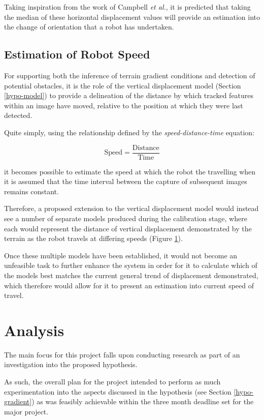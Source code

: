 Taking inspiration from the work of Campbell \textit{et al.}, it is predicted that taking the median of these horizontal displacement values will provide an estimation into the change of orientation that a robot has undertaken.

\subsection{Estimation of Robot Speed}
\label{hypo-speed}
For supporting both the inference of terrain gradient conditions and detection of potential obstacles, it is the role of the vertical displacement model (Section \ref{hypo-model})  to provide a delineation of the distance by which tracked features within an image have moved, relative to the position at which they were last detected. 

Quite simply, using the relationship defined by the \textit{speed-distance-time} equation:

\begin{equation}
\text{Speed} = \frac{\text{Distance}}{\text{Time}} 
\end{equation}

it becomes possible to estimate the speed at which the robot the travelling when it is assumed that the time interval between the capture of subsequent images remains constant.

Therefore, a proposed extension to the vertical displacement model would instead see a number of separate models produced during the calibration stage, where each would represent the distance of vertical displacement demonstrated by the terrain as the robot travels at differing speeds (Figure \ref{}).

Once these multiple models have been established, it would not become an unfeasible task to further enhance the system in order for it to calculate which of the models best matches the current general trend of displacement demonstrated, which therefore would allow for it to present an estimation into current speed of travel.

\section{Analysis}

The main focus for this project falls upon conducting research as part of an investigation into the proposed hypothesis. 

As such, the overall plan for the project intended to perform as much experimentation into the aspects discussed in the hypothesis (see Section \ref{hypo-gradient}) as was feasibly achievable within the three month deadline set for the major project.

